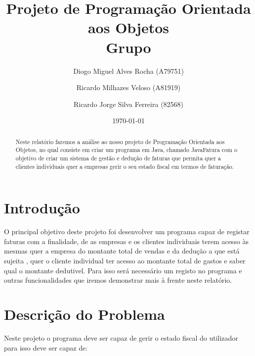 \documentclass[a4paper]{article}
\title{Projeto de Programação Orientada aos Objetos\\Grupo }
\author{Diogo Miguel Alves Rocha (A79751)\and Ricardo Milhazes Veloso (A81919) \and Ricardo Jorge Silva Ferreira (82568)}
\date{\today}
\begin{document}
\maketitle

\begin{abstract}
 
 Neste relatório faremos a análise ao nosso projeto de Programação Orientada aos Objetos, no qual consiste em criar um programa em Java, chamado JavaFatura com o objetivo de criar um sistema de gestão e dedução de faturas que permita quer a clientes individuais quer a empresas gerir o seu estado fiscal em termos de faturação.

 \end{abstract}

\tableofcontents

\section{Introdução}
\label{sec:intro} 

O principal objetivo deste projeto foi desenvolver um programa capaz de registar faturas com a finalidade, de as empresas e os clientes individuais terem acesso às mesmas quer a empresa do montante total de vendas e da dedução a que está sujeita , quer o cliente individual ter acesso ao montante total de gastos e saber qual o montante dedutivel. Para isso será necessário um registo no programa e outras funcionalidades que iremos demonstrar mais à frente neste relatório.


\section{Descrição do Problema}
Neste projeto o programa deve ser capaz de gerir o estado fiscal do utilizador para isso deve ser capaz de:
\end{document}
